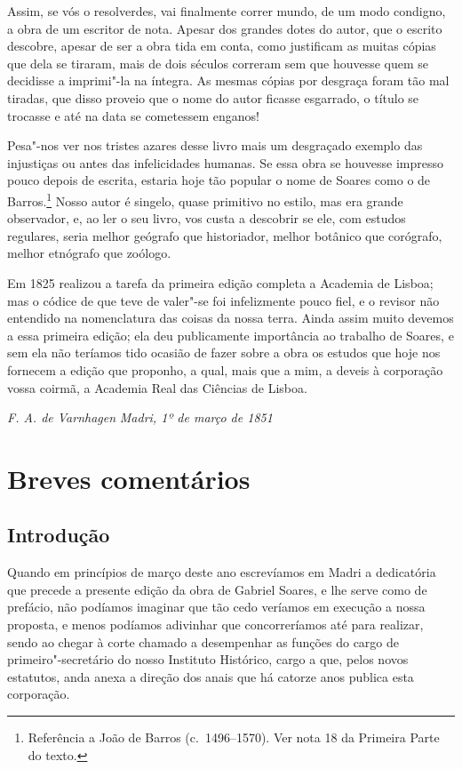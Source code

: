 \begin{linenumbers}
Assim, se vós o resolverdes, vai finalmente correr mundo, de um 
modo condigno, a obra de um escritor de nota. Apesar dos
grandes dotes do autor, que o escrito descobre, apesar de ser a obra tida 
em conta, como justificam as muitas cópias que dela se tiraram, mais de 
dois séculos correram sem que houvesse quem se decidisse a imprimi"-la 
na íntegra. As mesmas cópias por desgraça foram tão mal tiradas, que 
disso proveio que o nome do autor ficasse esgarrado, o título se trocasse 
e até na data se cometessem enganos!

Pesa"-nos ver nos tristes azares desse livro mais um desgraçado 
exemplo das injustiças ou antes das infelicidades humanas. Se essa obra 
se houvesse impresso pouco depois de escrita, estaria hoje tão popular o 
nome de Soares como o de Barros.\footnote{ Referência a João de Barros (c.~1496--1570). 
Ver nota 18 da Primeira Parte do texto.} Nosso autor é singelo, quase 
primitivo no estilo, mas era grande observador, e, ao ler o seu livro, vos 
custa a descobrir se ele, com estudos regulares, seria melhor geógrafo 
que historiador, melhor botânico que corógrafo, melhor etnógrafo que zoólogo.

Em 1825 realizou a tarefa da primeira edição completa a Academia 
de Lisboa; mas o códice de que teve de valer"-se foi infelizmente pouco 
fiel, e o revisor não entendido na nomenclatura das coisas da nossa terra. 
Ainda assim muito devemos a essa primeira edição; ela deu 
publicamente importância ao trabalho de Soares, e sem ela não teríamos 
tido ocasião de fazer sobre a obra os estudos que hoje nos fornecem a 
edição que proponho, a qual, mais que a mim, a deveis à corporação 
vossa coirmã, a Academia Real das Ciências de Lisboa.\\

\end{linenumbers}

\noindent\textit{F. A. de Varnhagen}  \textit{Madri, 1º de março de 1851}\\


\chapter[Breves comentários]{Breves comentários }

\section{Introdução}
\noindent Quando em princípios de março deste ano escrevíamos em Madri a 
dedicatória que precede a presente edição da obra de Gabriel Soares, e 
lhe serve como de prefácio, não podíamos imaginar que tão cedo 
veríamos em execução a nossa proposta, e menos podíamos adivinhar 
que concorreríamos até para realizar, sendo ao chegar à corte chamado a 
desempenhar as funções do cargo de primeiro"-secretário do nosso 
Instituto Histórico, cargo a que, pelos novos estatutos, anda anexa a 
direção dos anais que há catorze anos publica esta corporação.


